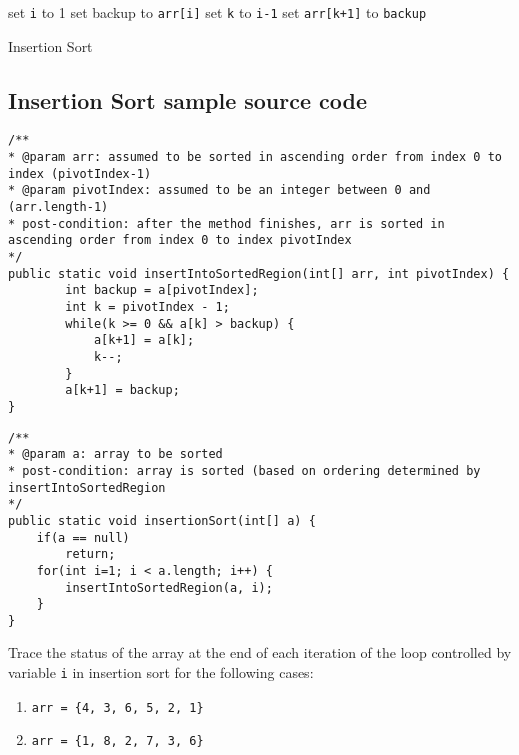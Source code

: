 \IncMargin{1em}
\begin{algorithm}[H]
	\SetAlgoLined
{}
set \texttt{i} to 1\;
 {
	set backup to \texttt{arr[i]}\;
	set \texttt{k} to \texttt{i-1}\;
	set \texttt{arr[k+1]} to \texttt{backup}\;
}
\caption{Insertion Sort \label{insertionsort}}
\end{algorithm}

\newpage
\subsection{Insertion Sort sample source code}

\begin{lstlisting}
/**
* @param arr: assumed to be sorted in ascending order from index 0 to index (pivotIndex-1)
* @param pivotIndex: assumed to be an integer between 0 and (arr.length-1)
* post-condition: after the method finishes, arr is sorted in ascending order from index 0 to index pivotIndex
*/
public static void insertIntoSortedRegion(int[] arr, int pivotIndex) {
		int backup = a[pivotIndex]; 
		int k = pivotIndex - 1;
		while(k >= 0 && a[k] > backup) { 
			a[k+1] = a[k]; 
			k--;
		}
		a[k+1] = backup; 
}
\end{lstlisting}

\begin{lstlisting}
/**
* @param a: array to be sorted
* post-condition: array is sorted (based on ordering determined by insertIntoSortedRegion 
*/
public static void insertionSort(int[] a) {
	if(a == null)
		return;
	for(int i=1; i < a.length; i++) {
		insertIntoSortedRegion(a, i);
	}
}
\end{lstlisting}

\begin{exercise}
Trace the status of the array at the end of each iteration of the loop controlled by variable \texttt{i} in insertion sort for the following cases:

\begin{enumerate}
\item \texttt{arr = \{4, 3, 6, 5, 2, 1\}}
\item \texttt{arr = \{1, 8, 2, 7, 3, 6\}}
\end{enumerate}
\end{exercise}


